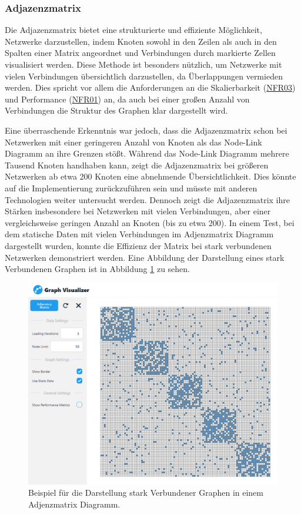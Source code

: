 \subsubsection{Adjazenzmatrix}

Die Adjazenzmatrix bietet eine strukturierte und effiziente Möglichkeit, Netzwerke darzustellen, indem Knoten sowohl in den Zeilen als auch in den Spalten einer Matrix angeordnet und Verbindungen durch markierte Zellen visualisiert werden. Diese Methode ist besonders nützlich, um Netzwerke mit vielen Verbindungen übersichtlich darzustellen, da Überlappungen vermieden werden. Dies spricht vor allem die Anforderungen an die Skalierbarkeit (\hyperref[NFR03]{NFR03}) und Performance (\hyperref[NFR01]{NFR01}) an, da auch bei einer großen Anzahl von Verbindungen die Struktur des Graphen klar dargestellt wird.

Eine überraschende Erkenntnis war jedoch, dass die Adjazenzmatrix schon bei Netzwerken mit einer geringeren Anzahl von Knoten als das Node-Link Diagramm an ihre Grenzen stößt. Während das Node-Link Diagramm mehrere Tausend Knoten handhaben kann, zeigt die Adjazenzmatrix bei größeren Netzwerken ab etwa 200 Knoten eine abnehmende Übersichtlichkeit. Dies könnte auf die Implementierung zurückzuführen sein und müsste mit anderen Technologien weiter untersucht werden. Dennoch zeigt die Adjazenzmatrix ihre Stärken insbesondere bei Netzwerken mit vielen Verbindungen, aber einer vergleichsweise geringen Anzahl an Knoten (bis zu etwa 200). In einem Test, bei dem statische Daten mit vielen Verbindungen im Adjenzmatrix Diagramm dargestellt wurden, konnte die Effizienz der Matrix bei stark verbundenen Netzwerken demonstriert werden. Eine Abbildung der Darstellung eines stark Verbundenen Graphen ist in Abbildung \ref{fig:realization:comparison:AdjacencyViewHighlyConnected} zu sehen.

\begin{figure}[h]
    \centering
    \includegraphics[height=.8\textwidth]{images/03/AdjacencyViewHighlyConnected.png}
    \caption{Beispiel für die Darstellung stark Verbundener Graphen in einem Adjenzmatrix Diagramm.}
    \label{fig:realization:comparison:AdjacencyViewHighlyConnected}
\end{figure}

